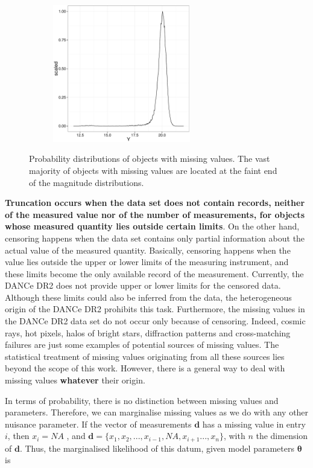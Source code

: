 \begin{figure}[ht!]
     \begin{subfigure}[t]{0.45\textwidth}
      \includegraphics[page=4,height=6cm]{background/Figures/MissingDistribution.pdf}
        \caption{}
        \label{} 
    \end{subfigure}
\caption{Probability distributions of objects with missing values. The vast majority of objects with missing values are located at the faint end of the magnitude distributions.}
\label{fig:NAsKs}
\end{figure}




\textbf{Truncation occurs when the data set does not contain records, neither of the measured value nor of the number of measurements, for objects whose measured quantity lies outside certain limits}. On the other hand, censoring happens when the data set contains only partial information about the actual value of the measured quantity. Basically,  censoring happens when the value lies outside the upper or lower limits of the measuring instrument, and these limits become the only available record of the measurement. Currently, the DANCe DR2 does not provide upper or lower limits for the censored data. Although these limits could also be inferred from the data, the heterogeneous origin of the DANCe DR2 prohibits this task. Furthermore, the missing values in the DANCe DR2 data set do not occur only because of censoring. Indeed, cosmic rays, hot pixels, halos of bright stars, diffraction patterns and cross-matching failures are just some examples of potential sources of missing values. The statistical treatment of missing values originating from all these sources lies beyond the scope of this work. However, there is a general way to deal with missing values \textbf{whatever} their origin.

In terms of probability, there is no distinction between missing values and parameters. Therefore, we can marginalise missing values as we do with any other nuisance parameter. If the vector of measurements $\mathbf{d}$ has a missing value in entry $i$, then $x_{i} = NA$ , and $\mathbf{d}=\{x_1,x_2,...,x_{i-1},NA,x_{i+1}...,x_n\}$, with $n$ the dimension of $\mathbf{d}$. Thus, the marginalised likelihood of this datum, given model parameters $\mathbf{\theta}$ is

